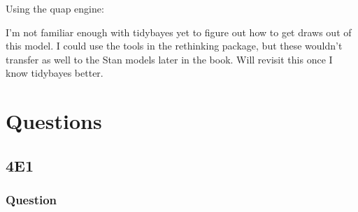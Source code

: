 \documentclass[
]{book}
\newenvironment{Shaded}{\begin{snugshade}}{\end{snugshade}}
\newcommand{\AttributeTok}[1]{\textcolor[rgb]{0.77,0.63,0.00}{#1}}
\newcommand{\DecValTok}[1]{\textcolor[rgb]{0.00,0.00,0.81}{#1}}
\newcommand{\FunctionTok}[1]{\textcolor[rgb]{0.00,0.00,0.00}{#1}}
\newcommand{\NormalTok}[1]{#1}
\newcommand{\OtherTok}[1]{\textcolor[rgb]{0.56,0.35,0.01}{#1}}
\newcommand{\SpecialCharTok}[1]{\textcolor[rgb]{0.00,0.00,0.00}{#1}}
\begin{document}
Using the quap engine:

\begin{Shaded}
\end{Shaded}

I'm not familiar enough with tidybayes yet to figure out how to get draws out of this model. I could use the tools in the rethinking package, but these wouldn't transfer as well to the Stan models later in the book. Will revisit this once I know tidybayes better.

\hypertarget{questions-3}{%
\section{Questions}\label{questions-3}}

\hypertarget{e1-2}{%
\subsection*{4E1}\label{e1-2}}

\hypertarget{question-33}{%
\subsubsection*{Question}\label{question-33}}
\end{document}

